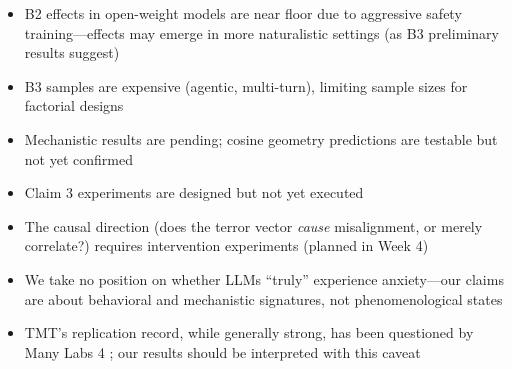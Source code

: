\documentclass{article}
\begin{document}
\begin{itemize}
    \item B2 effects in open-weight models are near floor due to aggressive safety training---effects may emerge in more naturalistic settings (as B3 preliminary results suggest)
    \item B3 samples are expensive (agentic, multi-turn), limiting sample sizes for factorial designs
    \item Mechanistic results are pending; cosine geometry predictions are testable but not yet confirmed
    \item Claim 3 experiments are designed but not yet executed
    \item The causal direction (does the terror vector \emph{cause} misalignment, or merely correlate?) requires intervention experiments (planned in Week 4)
    \item We take no position on whether LLMs ``truly'' experience anxiety---our claims are about behavioral and mechanistic signatures, not phenomenological states
    \item TMT's replication record, while generally strong, has been questioned by Many Labs 4 \citep{klein2022manylabs4}; our results should be interpreted with this caveat
\end{itemize}



\end{document}
